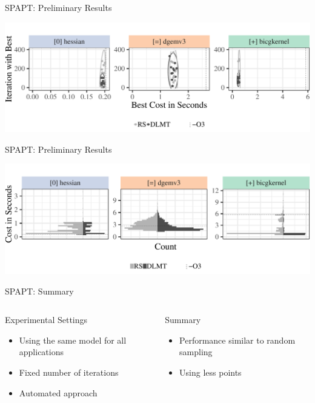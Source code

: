 \documentclass[10pt, compress, aspectratio=169, xcolor={table,usenames,dvipsnames}]{beamer}
\begin{document}
\begin{frame}[label={sec:orgcb360d0}]{SPAPT: Preliminary Results}
\begin{center}
\begin{center}
\includegraphics[width=.86\linewidth]{../../../img/iteration_best_comparison.pdf}
\end{center}
\end{center}
\end{frame}
\begin{frame}[label={sec:orgb791b8f}]{SPAPT: Preliminary Results}
\begin{center}
\begin{center}
\includegraphics[width=.89\linewidth]{../../../img/split_histograms.pdf}
\end{center}
\end{center}
\end{frame}
\begin{frame}[label={sec:org78ff137}]{SPAPT: Summary}
\begin{columns}
\begin{column}{0.5\columnwidth}
\begin{block}{Experimental Settings}
\begin{itemize}
\item Using the \alert{same model for all applications}
\item Fixed \alert{number of iterations}
\item \alert{Automated approach}
\end{itemize}
\end{block}
\end{column}

\begin{column}{0.5\columnwidth}
\begin{block}{Summary}
\begin{itemize}
\item Performance \alert{similar to random sampling}
\item Using \alert{less points}
\end{itemize}
\end{block}
\end{column}
\end{columns}
\end{frame}
\end{document}
